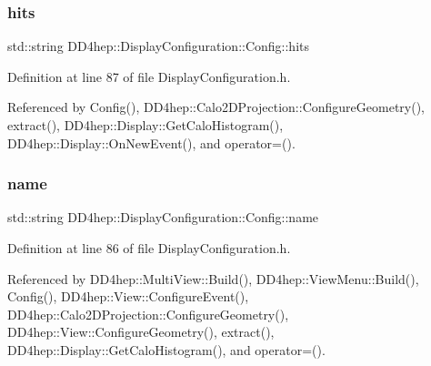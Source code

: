 \hypertarget{class_d_d4hep_1_1_display_configuration_1_1_config_af16ac4baf6e5e53a8ee3c971f74a5686}{}\label{class_d_d4hep_1_1_display_configuration_1_1_config_af16ac4baf6e5e53a8ee3c971f74a5686} 
\subsubsection{\texorpdfstring{hits}{hits}}
{\footnotesize\ttfamily std\+::string D\+D4hep\+::\+Display\+Configuration\+::\+Config\+::hits}



Definition at line 87 of file Display\+Configuration.\+h.



Referenced by Config(), D\+D4hep\+::\+Calo2\+D\+Projection\+::\+Configure\+Geometry(), extract(), D\+D4hep\+::\+Display\+::\+Get\+Calo\+Histogram(), D\+D4hep\+::\+Display\+::\+On\+New\+Event(), and operator=().

\hypertarget{class_d_d4hep_1_1_display_configuration_1_1_config_adefaa09fe7cde3bb7330de97cf07a1ba}{}\label{class_d_d4hep_1_1_display_configuration_1_1_config_adefaa09fe7cde3bb7330de97cf07a1ba} 
\subsubsection{\texorpdfstring{name}{name}}
{\footnotesize\ttfamily std\+::string D\+D4hep\+::\+Display\+Configuration\+::\+Config\+::name}



Definition at line 86 of file Display\+Configuration.\+h.



Referenced by D\+D4hep\+::\+Multi\+View\+::\+Build(), D\+D4hep\+::\+View\+Menu\+::\+Build(), Config(), D\+D4hep\+::\+View\+::\+Configure\+Event(), D\+D4hep\+::\+Calo2\+D\+Projection\+::\+Configure\+Geometry(), D\+D4hep\+::\+View\+::\+Configure\+Geometry(), extract(), D\+D4hep\+::\+Display\+::\+Get\+Calo\+Histogram(), and operator=().

\hypertarget{class_d_d4hep_1_1_display_configuration_1_1_config_a39e4104003d0a6fe90053120cc97fd60}{}\label{class_d_d4hep_1_1_display_configuration_1_1_config_a39e4104003d0a6fe90053120cc97fd60} 
